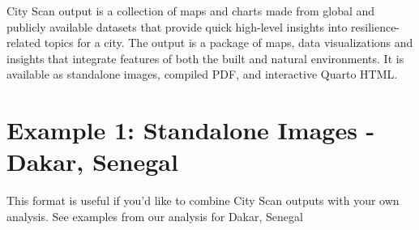 \documentclass[
  letterpaper,
  DIV=11,
  numbers=noendperiod]{scrreprt}
\begin{document}
City Scan output is a collection of maps and charts made from global and
publicly available datasets that provide quick high-level insights into
resilience-related topics for a city. The output is a package of maps,
data visualizations and insights that integrate features of both the
built and natural environments. It is available as standalone images,
compiled PDF, and interactive Quarto HTML.

\section{Example 1: Standalone Images - Dakar,
Senegal}\label{example-1-standalone-images---dakar-senegal}

This format is useful if you'd like to combine City Scan outputs with
your own analysis. See examples from our analysis for Dakar, Senegal
\end{document}
